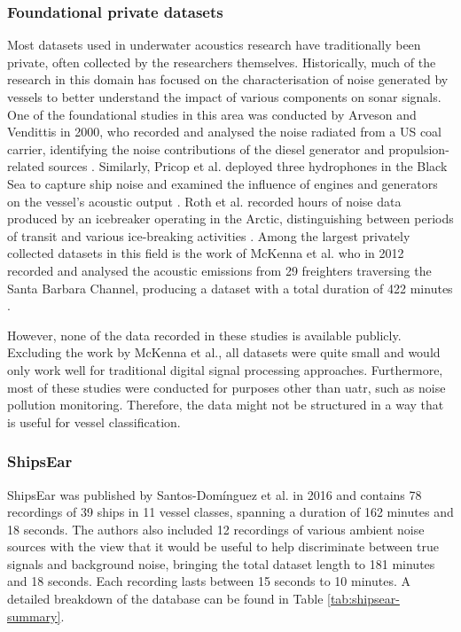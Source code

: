 \subsubsection{Foundational private datasets}

Most datasets used in underwater acoustics research have traditionally been private, often collected by the researchers themselves. Historically, much of the research in this domain has focused on the characterisation of noise generated by vessels to better understand the impact of various components on sonar signals. One of the foundational studies in this area was conducted by Arveson and Vendittis in 2000, who recorded and analysed the noise radiated from a US coal carrier, identifying the noise contributions of the diesel generator and propulsion-related sources \cite{arveson_radiated_2000}. Similarly, Pricop et al. deployed three hydrophones in the Black Sea to capture ship noise and examined the influence of engines and generators on the vessel's acoustic output \cite{pricop_underwater_2010}. Roth et al. recorded hours of noise data produced by an icebreaker operating in the Arctic, distinguishing between periods of transit and various ice-breaking activities \cite{roth_underwater_2013}. Among the largest privately collected datasets in this field is the work of McKenna et al. who in 2012 recorded and analysed the acoustic emissions from 29 freighters traversing the Santa Barbara Channel, producing a dataset with a total duration of 422 minutes \cite{mckenna_underwater_2012}. 

However, none of the data recorded in these studies is available publicly. Excluding the work by McKenna et al., all datasets were quite small and would only work well for traditional digital signal processing approaches. Furthermore, most of these studies were conducted for purposes other than \acrshort{uatr}, such as noise pollution monitoring. Therefore, the data might not be structured in a way that is useful for vessel classification.

\subsubsection{ShipsEar}

ShipsEar \cite{david_santos-dominguez_shipsear_2016} was published by Santos-Dom\'inguez et al. in 2016 and contains 78 recordings of 39 ships in 11 vessel classes, spanning a duration of 162 minutes and 18 seconds. The authors also included 12 recordings of various ambient noise sources with the view that it would be useful to help discriminate between true signals and background noise, bringing the total dataset length to 181 minutes and 18 seconds. Each recording lasts between 15 seconds to 10 minutes. A detailed breakdown of the database can be found in Table \ref{tab:shipsear-summary}. 

